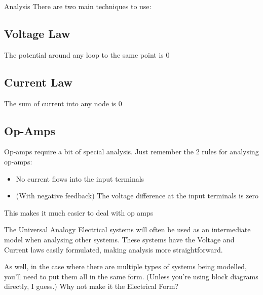 \documentclass{../templates/topic}
\begin{document}
\begin{section}{Analysis}
	There are two main techniques to use:
	\subsection{Voltage Law}
		The potential around any loop to the same point is 0
	\subsection{Current Law}
		The sum of current into any node is 0
		
	\subsection{Op-Amps}
		Op-amps require a bit of special analysis. Just remember the 2 rules for analysing op-amps:
		\begin{itemize}
			\item No current flows into the input terminals
			\item (With negative feedback) The voltage difference at the input terminals is zero
		\end{itemize}
		
		This makes it much easier to deal with op amps
		
		
\end{section}

\begin{section}{The Universal Analogy}
	Electrical systems will often be used as an intermediate model when analysing other systems. These systems have the Voltage and Current laws easily formulated, making analysis more straightforward.
	
	As well, in the case where there are multiple types of systems being modelled, you'll need to put them all in the same form. (Unless you're using block diagrams directly, I guess.) Why not make it the Electrical Form?
		
\end{section}
\end{document}
